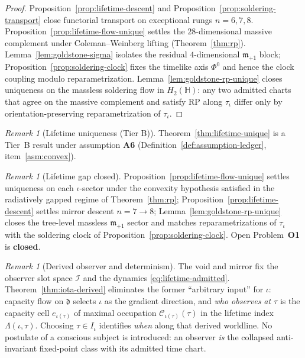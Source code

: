\documentclass[11pt]{article}
\theoremstyle{plain}
\theoremstyle{definition}
\theoremstyle{remark}
\newtheorem{remark}[theorem]{Remark}
\numberwithin{equation}{section}
\newcommand{\Quat}{\mathbb{H}}
\newcommand{\capacity}{\mathcal{C}}
\newcommand{\orderparam}{\Phi}
\begin{document}
\begin{proof}
Proposition~\ref{prop:lifetime-descent} and
Proposition~\ref{prop:soldering-transport} close functorial transport on
exceptional rungs $n=6,7,8$. Proposition~\ref{prop:lifetime-flow-unique}
settles the $28$-dimensional massive complement under Coleman--Weinberg lifting
(Theorem~\ref{thm:rp}). Lemma~\ref{lem:goldstone-sigma} isolates the residual
$4$-dimensional $\mathfrak{m}_{+1}$ block; Proposition~\ref{prop:soldering-clock}
fixes the timelike axis $\orderparam^0$ and hence the clock coupling modulo
reparametrization. Lemma~\ref{lem:goldstone-rp-unique} closes uniqueness on
the massless soldering flow in $H_2(\Quat)$: any two admitted charts that
agree on the massive complement and satisfy RP along $\tau_\iota$ differ only
by orientation-preserving reparametrization of $\tau_\iota$.
\end{proof}

\begin{remark}[Lifetime uniqueness (Tier B)]
\label{rem:lifetime-tier}
Theorem~\ref{thm:lifetime-unique} is a Tier~B result under assumption
\textbf{A6} (Definition~\ref{def:assumption-ledger}, item~\ref{asm:convex}).
\end{remark}

\begin{remark}[Lifetime gap closed]
\label{rem:lifetime-full-gap}
Proposition~\ref{prop:lifetime-flow-unique} settles uniqueness on each
$\iota$-sector under the convexity hypothesis satisfied in the radiatively
gapped regime of Theorem~\ref{thm:rp}; Proposition~\ref{prop:lifetime-descent}
settles mirror descent $n=7\to8$; Lemma~\ref{lem:goldstone-rp-unique} closes
the tree-level massless $\mathfrak{m}_{+1}$ sector and matches
reparametrizations of $\tau_\iota$ with the soldering clock of
Proposition~\ref{prop:soldering-clock}. Open Problem~\textbf{O1} is
\textbf{closed}.
\end{remark}

\begin{remark}[Derived observer and determinism]\label{rem:observer-derived}
The void and mirror fix the observer slot space $\mathcal{I}$ and the dynamics
\eqref{eq:lifetime-admitted}. Theorem~\ref{thm:iota-derived} eliminates the
former ``arbitrary input'' for $\iota$: capacity flow on $\mathfrak{d}$
selects $\iota$ as the gradient direction, and \emph{who observes at $\tau$}
is the capacity cell $e_{\iota(\tau)}$ of maximal occupation
$\capacity_{\iota(\tau)}(\tau)$ in the lifetime index
$\Lambda(\iota,\tau)$. Choosing $\tau\in I_\iota$ identifies \emph{when} along
that derived worldline. No postulate of a conscious subject is introduced: an
observer \emph{is} the collapsed anti-invariant fixed-point class with its
admitted time chart.
\end{remark}%
\end{document}
